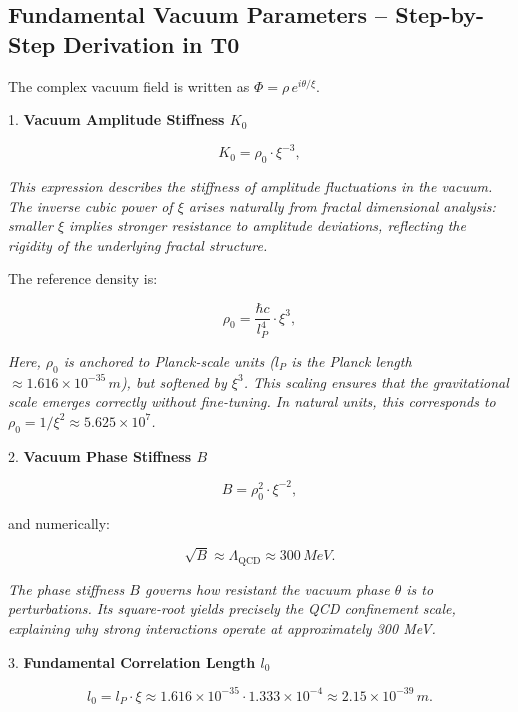 	\subsection*{Fundamental Vacuum Parameters – Step-by-Step Derivation in T0}
	
	The complex vacuum field is written as \(\Phi = \rho\, e^{i \theta / \xi}\).
	
	1. \textbf{Vacuum Amplitude Stiffness \(K_0\)}
	
	\begin{equation}
		K_0 = \rho_0 \cdot \xi^{-3},
	\end{equation}
	
	\textit{This expression describes the stiffness of amplitude fluctuations in the vacuum. The inverse cubic power of \(\xi\) arises naturally from fractal dimensional analysis: smaller \(\xi\) implies stronger resistance to amplitude deviations, reflecting the rigidity of the underlying fractal structure.}
	
	The reference density is:
	
	\begin{equation}
		\rho_0 = \frac{\hbar c}{l_P^4} \cdot \xi^3,
	\end{equation}
	
	\textit{Here, \(\rho_0\) is anchored to Planck-scale units (\(l_P\) is the Planck length \(\approx 1.616 \times 10^{-35}\,\si{m}\)), but softened by \(\xi^3\). This scaling ensures that the gravitational scale emerges correctly without fine-tuning. In natural units, this corresponds to \(\rho_0 = 1/\xi^2 \approx 5.625 \times 10^7\).}
	
	2. \textbf{Vacuum Phase Stiffness \(B\)}
	
	\begin{equation}
		B = \rho_0^2 \cdot \xi^{-2},
	\end{equation}
	
	and numerically:
	
	\begin{equation}
		\sqrt{B} \approx \Lambda_{\text{QCD}} \approx 300\,\si{MeV}.
	\end{equation}
	
	\textit{The phase stiffness \(B\) governs how resistant the vacuum phase \(\theta\) is to perturbations. Its square-root yields precisely the QCD confinement scale, explaining why strong interactions operate at approximately 300 MeV.}
	
	3. \textbf{Fundamental Correlation Length \(l_0\)}
	
	\begin{equation}
		l_0 = l_P \cdot \xi \approx 1.616 \times 10^{-35} \cdot 1.333 \times 10^{-4} \approx 2.15 \times 10^{-39}\,\si{m}.
	\end{equation}
	
